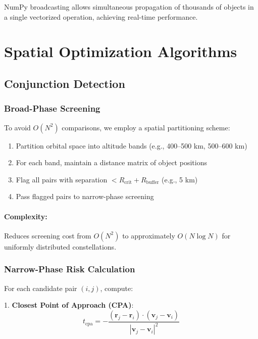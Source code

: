 \documentclass[11pt,a4paper]{article}
\begin{document}
NumPy broadcasting allows simultaneous propagation of thousands of objects in a single vectorized operation, achieving real-time performance.

\section{Spatial Optimization Algorithms}

\subsection{Conjunction Detection}

\subsubsection{Broad-Phase Screening}

To avoid $O(N^2)$ comparisons, we employ a spatial partitioning scheme:

\begin{enumerate}
    \item Partition orbital space into altitude bands (e.g., 400--500 km, 500--600 km)
    \item For each band, maintain a distance matrix of object positions
    \item Flag all pairs with separation $< R_{\text{crit}} + R_{\text{buffer}}$ (e.g., 5 km)
    \item Pass flagged pairs to narrow-phase screening
\end{enumerate}

\paragraph{Complexity:} Reduces screening cost from $O(N^2)$ to approximately $O(N \log N)$ for uniformly distributed constellations.

\subsubsection{Narrow-Phase Risk Calculation}

For each candidate pair $(i, j)$, compute:

1. \textbf{Closest Point of Approach (CPA)}:
   \begin{equation}
   t_{\text{cpa}} = -\frac{(\mathbf{r}_j - \mathbf{r}_i) \cdot (\mathbf{v}_j - \mathbf{v}_i)}{|\mathbf{v}_j - \mathbf{v}_i|^2}
   \end{equation}
\end{document}
